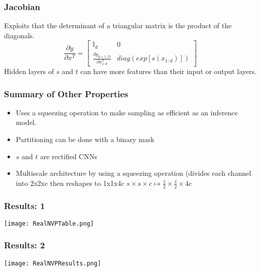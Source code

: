 \begin{frame}
\frametitle{Jacobian}
Exploits that the determinant of a triangular matrix is the product of the
diagonals.
\begin{equation}
\frac{\partial y}{\partial x^T} = \begin{bmatrix} \mathbb{I}_d & 0 \\
        \frac{\partial y_{d+1:D}}{\partial x_{1:d}^T} & diag(exp[s(x_{1:d})])
        \end{bmatrix}
\end{equation}
Hidden layers of $s$ and $t$ can have more features than their input or output
layers.
\end{frame}

\begin{frame}
\frametitle{Summary of Other Properties}
    \begin{itemize}
        \item Uses a squeezing operation to make sampling as efficient as an
        inference model.
        \item Partitioning can be done with a binary mask
        \item $s$ and $t$ are rectified CNNs
        \item Multiscale architecture by using a squeezing operation (divides
                each channel into 2x2xc then reshapes to 1x1x4c $s\times s\times
                c \mapsto \frac s2\times \frac s2\times 4c$
    \end{itemize}
\end{frame}

\begin{frame}
\frametitle{Results: 1}
\center\texttt{[image: RealNVPTable.png]}
\end{frame}

\begin{frame}
\frametitle{Results: 2}
\center\texttt{[image: RealNVPResults.png]}
\end{frame}
